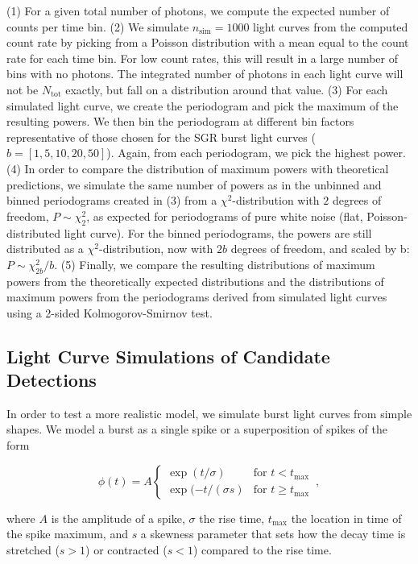 \documentclass[numberedappendix]{emulateapj}
\begin{document}
(1) For a given total number of photons, we compute the expected number of counts per time bin. 
(2) We simulate $n_{\mathrm{sim}} = 1000$ light curves from the computed count rate by picking from a Poisson distribution with a mean equal to the count rate for each time bin. For low count rates, this will result in a large number of bins with no photons. The integrated number of photons in each light curve will not be $N_{\mathrm{tot}}$ exactly, but fall on a distribution around that value.
(3) For each simulated light curve, we create the periodogram and pick the maximum of the resulting powers. We then bin the periodogram at different bin factors representative of those chosen for the SGR burst light curves ($b = [1, 5, 10, 20, 50]$). Again, from each periodogram, we pick the highest power.
(4) In order to compare the distribution of maximum powers with theoretical predictions, we simulate the same number of powers as in the unbinned and binned periodograms created in (3) from a $\chi^2$-distribution with $2$ degrees of freedom, $P \sim \chi^2_2$, as expected for periodograms of pure white noise (flat, Poisson-distributed light curve). For the binned periodograms, the powers are still distributed as a $\chi^2$-distribution, now with $2b$ degrees of freedom, and scaled by b: $P \sim \chi^2_{2b}/b$.
(5) Finally, we compare the resulting distributions of maximum powers from the theoretically expected distributions and the distributions of maximum powers from the periodograms derived from simulated light curves using a 2-sided Kolmogorov-Smirnov test. 

\subsection{Light Curve Simulations of Candidate Detections}

In order to test a more realistic model, we simulate burst light curves from simple shapes. We model a burst as a single spike or a superposition of spikes of the form

\begin{equation}
\phi(t) = A \left\{\begin{array}{ll}\exp(t/\sigma) & \mbox{for $t<t_\mathrm{max}$}\\ \exp(-t/(\sigma s) & \mbox{for $t\geq t_{\mathrm{max}}$}\end{array}\right. \, ,
\end{equation}

where $A$ is the amplitude of a spike, $\sigma$ the rise time, $t_\mathrm{max}$ the location in time of the spike maximum, and $s$ a skewness parameter that sets how the decay time is stretched ($s > 1$) or contracted ($s < 1$) compared to the rise time. 
\end{document}
